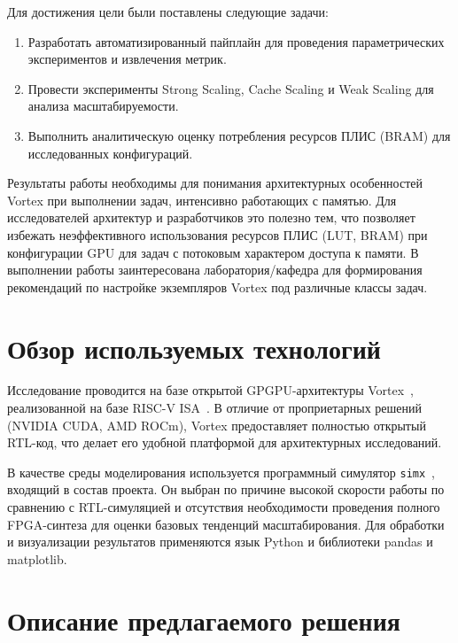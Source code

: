 \documentclass[a4paper]{article}
\begin{document}
Для достижения цели были поставлены следующие задачи:
\begin{enumerate}
    \item Разработать автоматизированный пайплайн для проведения параметрических экспериментов и извлечения метрик.
    \item Провести эксперименты Strong Scaling, Cache Scaling и Weak Scaling для анализа масштабируемости.
    \item Выполнить аналитическую оценку потребления ресурсов ПЛИС (BRAM) для исследованных конфигураций.
\end{enumerate}

Результаты работы необходимы для понимания архитектурных особенностей Vortex при выполнении задач, интенсивно работающих с памятью. Для исследователей архитектур и разработчиков это полезно тем, что позволяет избежать неэффективного использования ресурсов ПЛИС (LUT, BRAM) при конфигурации GPU для задач с потоковым характером доступа к памяти. В выполнении работы заинтересована лаборатория/кафедра для формирования рекомендаций по настройке экземпляров Vortex под различные классы задач.

\section{Обзор используемых технологий}

Исследование проводится на базе открытой GPGPU-архитектуры Vortex~\cite{vortex_repo}, реализованной на базе RISC-V ISA~\cite{riscv_isa}. В отличие от проприетарных решений (NVIDIA CUDA, AMD ROCm), Vortex предоставляет полностью открытый RTL-код, что делает его удобной платформой для архитектурных исследований.

В качестве среды моделирования используется программный симулятор \texttt{simx}~\cite{vortex_simx}, входящий в состав проекта. Он выбран по причине высокой скорости работы по сравнению с RTL-симуляцией и отсутствия необходимости проведения полного FPGA-синтеза для оценки базовых тенденций масштабирования. Для обработки и визуализации результатов применяются язык Python и библиотеки pandas и matplotlib.

\section{Описание предлагаемого решения}
\end{document}
